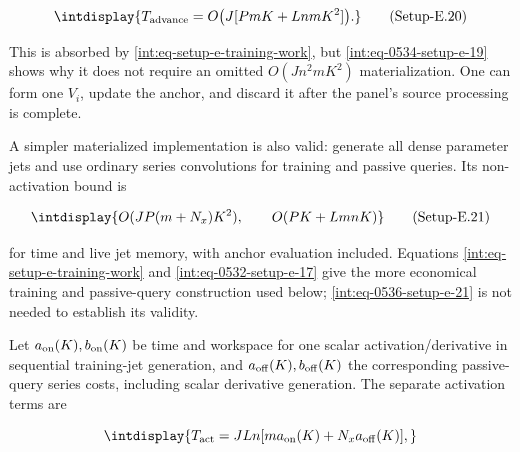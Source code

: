 \label{int:eq-setup-e-20}
\begingroup\renewcommand{\theHequation}{intdisplay.1024}
\begin{equation}
\intdisplay{
T_{\rm advance}=O\bigl(J[PmK+LnmK^2]\bigr).
}
\tag{Setup-E.20}
\label{int:eq-0535-setup-e-20}
\end{equation}
\endgroup


This is absorbed by \eqref{int:eq-setup-e-training-work}, but \hyperref[int:eq-setup-e-19]{\eqref{int:eq-0534-setup-e-19}} shows why it does not require an omitted \(O(Jn^2mK^2)\) materialization. One can form one \(V_i\), update the anchor, and discard it after the panel's source processing is complete.



A simpler materialized implementation is also valid: generate all dense parameter jets and use ordinary series convolutions for training and passive queries. Its non-activation bound is


\label{int:eq-setup-e-21}
\begingroup\renewcommand{\theHequation}{intdisplay.1025}
\begin{equation}
\intdisplay{
O(JP(m+N_x)K^2),\qquad O(PK+LmnK)
}
\tag{Setup-E.21}
\label{int:eq-0536-setup-e-21}
\end{equation}
\endgroup


for time and live jet memory, with anchor evaluation included. Equations \eqref{int:eq-setup-e-training-work} and \eqref{int:eq-0532-setup-e-17} give the more economical training and passive-query construction used below; \hyperref[int:eq-setup-e-21]{\eqref{int:eq-0536-setup-e-21}} is not needed to establish its validity.



Let \(a_{\rm on}(K),\allowbreak b_{\rm on}(K)\) be time and workspace for one scalar activation/derivative in sequential training-jet generation, and \(a_{\rm off}(K),\allowbreak b_{\rm off}(K)\) the corresponding passive-query series costs, including scalar derivative generation. The separate activation terms are


\begingroup\renewcommand{\theHequation}{intdisplay.1026}
\begin{equation*}
\intdisplay{
T_{\rm act}=JLn[ma_{\rm on}(K)+N_xa_{\rm off}(K)],
}
\end{equation*}
\endgroup

